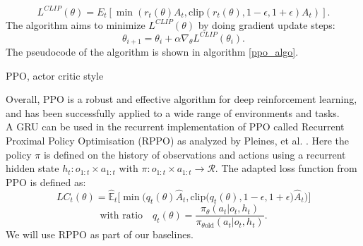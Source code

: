 \begin{equation}
        L^{CLIP}(\theta) = {E}_t \left[ \min \left(r_t(\theta) {A}_t, \text{clip} \left(r_t(\theta), 1-\epsilon, 1+\epsilon \right) {A}_t \right) \right].
\end{equation}
The algorithm aims to minimize $L^{CLIP}(\theta)$ by doing gradient update steps:
\begin{equation}
    \theta_{i+1} = \theta_{i} + \alpha \nabla_{\theta} L^{CLIP}(\theta_i).
\end{equation}
The pseudocode of the algorithm is shown in algorithm \ref{ppo_algo}.
\begin{algorithm}[h]
    \SetAlgoLined
    \begin{algorithmic}
        
    \end{algorithmic}
    \caption{PPO, actor critic style}
    \label{ppo_algo}

\end{algorithm}
Overall, PPO is a robust and effective algorithm for deep reinforcement learning, and has been successfully applied to a wide range of environments and tasks.\\

A GRU can be used in the recurrent implementation of PPO called Recurrent Proximal Policy Optimisation (RPPO) as analyzed by Pleines, et al. 
\cite{RPPO}. Here the policy $\pi$ is defined on the history of observations and actions using a recurrent hidden state $h_t : o_{1:t} \times a_{1:t}$ with $\pi : o_{1:t} \times a_{1:t} \rightarrow \mathcal{R}$.
The adapted loss function from PPO is defined as:
\begin{equation}
    LC_t(\theta) = \widehat{\mathbb{E}}_t\big[\min\big(q_t(\theta)\widehat{A}_t, \text{clip}\big(q_t(\theta), 1 - \epsilon, 1 + \epsilon\big)\widehat{A}_t\big)\big] \tag{1}
\end{equation}
\begin{equation*}
    \text{with ratio} \quad q_t(\theta) = \frac{\pi_{\theta}(a_t \vert o_t, h_t)}{\pi_{\theta \text{old}}(a_t \vert o_t, h_t)}.
\end{equation*}
We will use RPPO as part of our baselines.


